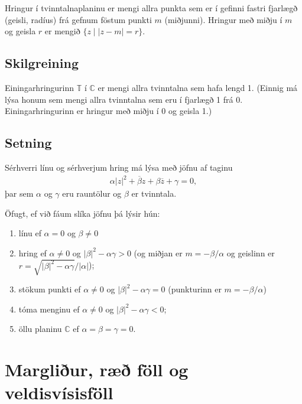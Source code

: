 \documentclass[a4paper,10pt,icelandic]{sphinxmanual}
\begin{document}
Hringur í tvinntalnaplaninu er mengi allra punkta sem er í gefinni
fastri fjarlægð (geisli, radíus) frá gefnum föstum punkti \(m\)
(miðjunni). Hringur með miðju í \(m\) og geisla \(r\) er mengið
\(\{z\mid |z-m|=r\}\).


\subsection{Skilgreining}
\label{\detokenize{Kafli01:id8}}
Einingarhringurinn \(\mathbb{T}\) í \({\mathbb{C}}\) er mengi
allra tvinntalna sem hafa lengd 1. (Einnig má lýsa honum sem mengi allra
tvinntalna sem eru í fjarlægð 1 frá \(0\). Einingarhringurinn er
hringur með miðju í 0 og geisla 1.)


\subsection{Setning}
\label{\detokenize{Kafli01:id9}}
Sérhverri línu og sérhverjum hring má lýsa með jöfnu af
taginu
\begin{equation*}
\begin{split}\alpha|z|^2+\overline{\beta} z+\beta\overline{z}+\gamma=0,\end{split}
\end{equation*}
þar sem \(\alpha\) og \(\gamma\) eru rauntölur og \(\beta\)
er tvinntala.

Öfugt, ef við fáum slíka jöfnu þá lýsir hún:
\begin{enumerate}
%
\item {} 
línu ef \(\alpha=0\) og \(\beta \neq 0\)

\item {} 
hring ef \(\alpha\neq 0\) og \(|\beta|^2-\alpha\gamma>0\) (og miðjan er \(m=-\beta/\alpha\) og geislinn er \(r=\sqrt{|\beta|^2-\alpha\gamma}/|\alpha|\));

\item {} 
stökum punkti ef \(\alpha\neq 0\) og \(|\beta|^2-\alpha\gamma=0\) (punkturinn er \(m=-\beta/\alpha\))

\item {} 
tóma menginu ef \(\alpha\neq 0\) og \(|\beta|^2-\alpha\gamma<0\);

\item {} 
öllu planinu \({\mathbb{C}}\) ef \(\alpha=\beta=\gamma=0\).

\end{enumerate}


\section{Margliður, ræð föll og veldisvísisföll}
\label{\detokenize{Kafli01:margliur-rae-foll-og-veldisvisisfoll}}
\end{document}
